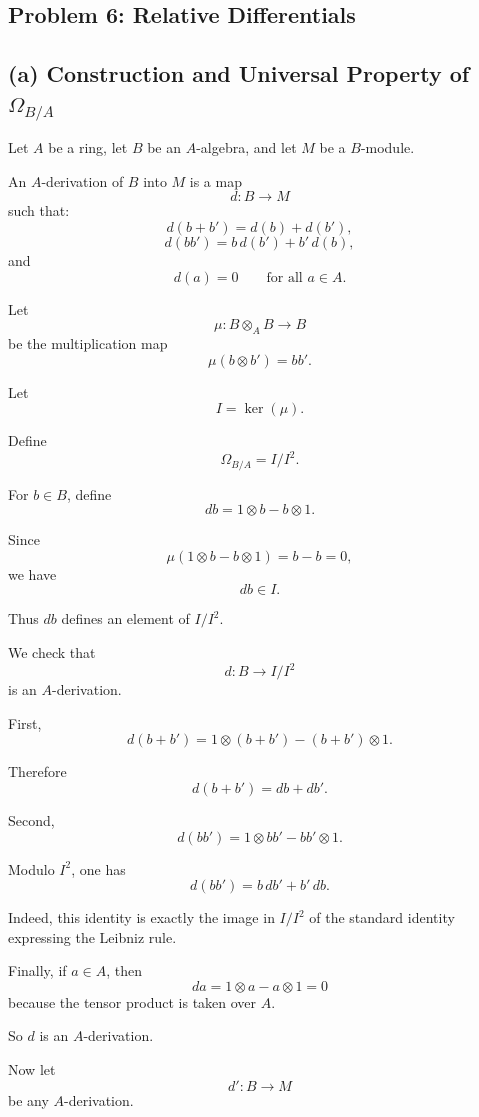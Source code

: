 
\subsection*{Problem 6: Relative Differentials}

\subsection*{(a) Construction and Universal Property of \(\Omega_{B/A}\)}

Let \(A\) be a ring, let \(B\) be an \(A\)-algebra, and let \(M\) be a
\(B\)-module.

An \(A\)-derivation of \(B\) into \(M\) is a map
\[
d:B\to M
\]
such that:
\[
d(b+b')=d(b)+d(b'),
\]
\[
d(bb')=b\,d(b')+b'\,d(b),
\]
and
\[
d(a)=0
\qquad
\text{for all }a\in A.
\]

Let
\[
\mu:B\otimes_A B\longrightarrow B
\]
be the multiplication map
\[
\mu(b\otimes b')=bb'.
\]

Let
\[
I=\ker(\mu).
\]

Define
\[
\Omega_{B/A}=I/I^2.
\]

For \(b\in B\), define
\[
db=1\otimes b-b\otimes1.
\]

Since
\[
\mu(1\otimes b-b\otimes1)=b-b=0,
\]
we have
\[
db\in I.
\]

Thus \(db\) defines an element of \(I/I^2\).

We check that
\[
d:B\to I/I^2
\]
is an \(A\)-derivation.

First,
\[
d(b+b')
=
1\otimes(b+b')-(b+b')\otimes1.
\]

Therefore
\[
d(b+b')=db+db'.
\]

Second,
\[
d(bb')
=
1\otimes bb'-bb'\otimes1.
\]

Modulo \(I^2\), one has
\[
d(bb')=b\,db'+b'\,db.
\]

Indeed, this identity is exactly the image in \(I/I^2\) of the standard
identity expressing the Leibniz rule.

Finally, if \(a\in A\), then
\[
da=1\otimes a-a\otimes1=0
\]
because the tensor product is taken over \(A\).

So \(d\) is an \(A\)-derivation.

Now let
\[
d':B\to M
\]
be any \(A\)-derivation.

